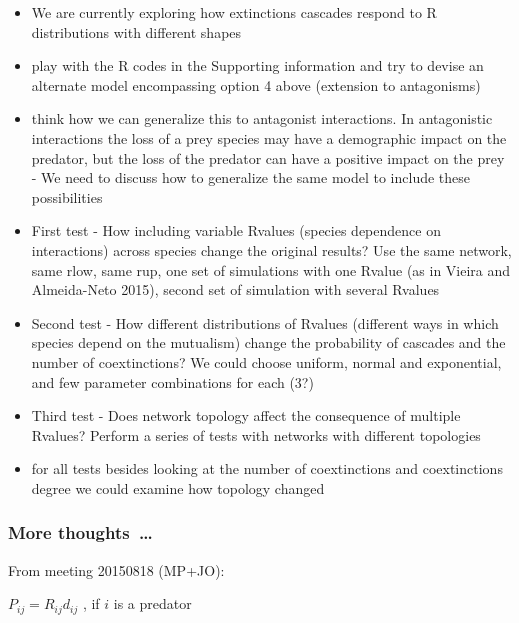 \documentclass[12pt]{article}
\begin{document}
\begin{itemize}
	
	\item We are currently exploring how extinctions cascades respond to R distributions with different shapes
	
	\item play with the R codes in the Supporting information and try to devise an alternate model encompassing option 4 above (extension to antagonisms)
	
	\item think how we can generalize this to antagonist interactions. In antagonistic interactions the loss of a prey species may have a demographic impact on the predator, but the loss of the predator can have a positive impact on the prey - We need to discuss how to generalize the same model to include these possibilities


	\item First test - How including variable Rvalues (species dependence on interactions) across species change the original results? Use the same network, same rlow, same rup, one set of simulations with one Rvalue (as in Vieira and Almeida-Neto 2015), second set of simulation with several Rvalues

	\item Second test - How different distributions of Rvalues (different ways in which species depend on the mutualism) change the probability of cascades and the number of coextinctions? We could choose uniform, normal and exponential, and few parameter combinations for each (3?)

	\item Third test - Does network topology affect the consequence of multiple Rvalues? Perform a series of tests with networks with different topologies

	\item for all tests besides looking at the number of coextinctions and coextinctions degree we could examine how topology changed

\end{itemize}

\subsubsection*{More thoughts~\ldots}

From meeting 20150818 (MP+JO):

$P_{ij} = R_{ij} d_{ij}$ , if $i$ is a predator\\
\end{document}
